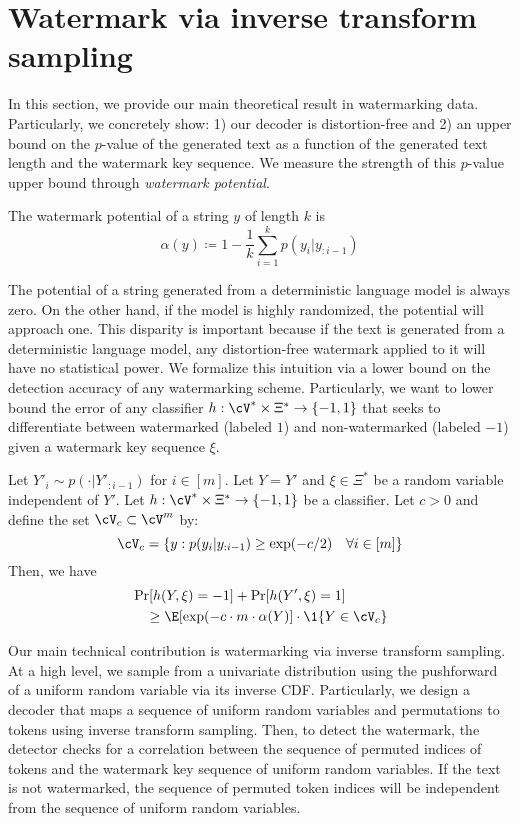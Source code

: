 \section{Watermark via inverse transform sampling}
\label{sec:inverse-transform}
%
In this section, we provide our main theoretical result in watermarking data. Particularly, we concretely show: 1) our decoder is distortion-free and 2) an upper bound on the $p$-value of the generated text as a function of the generated text length and the watermark key sequence. We measure the strength of this $p$-value upper bound through \emph{watermark potential}.
%
\begin{definition}
    The watermark potential of a string $y$ of length $k$ is %
    \begin{equation*}
        \alpha(y) \coloneqq 1 - \frac{1}{k} \sum_{i=1}^{k} p(y_i | y_{:i-1})
    \end{equation*}
    \label{def:potential}
\end{definition}
%
The potential of a string generated from a deterministic language model is always zero. On the other hand, if the model is highly randomized, the potential will approach one. This disparity is important because if the text is generated from a deterministic language model, any distortion-free watermark applied to it will have no statistical power. We formalize this intuition via a lower bound on the detection accuracy of any watermarking scheme. Particularly, we want to lower bound the error of any classifier $h: \cV^* \times \Xi^* \rightarrow \{-1,1\}$ that seeks to differentiate between watermarked (labeled $1$) and non-watermarked (labeled $-1$) given a watermark key sequence $\xi$. 
%
\begin{lemma}
Let $Y'_i \sim p(\cdot | Y'_{:i-1})$ for $i \in [m]$. Let $Y = Y'$ and $\xi \in \Xi^*$ be a random variable independent of $Y'$. Let $h: \cV^* \times \Xi^* \rightarrow \{-1,1\}$ be a classifier. Let $c > 0$ and define the set $\cV_c \subset \cV^m$ by:
%
\begin{equation*}
    \cV_{c} = \{ y: p(y_i | y_{:i-1}) \geq \exp(-c/2) \quad \forall i \in [m] \}
\end{equation*}
Then, we have
%
\begin{align*}
    &\Pr[h(Y, \xi) = -1] + \Pr[h(Y', \xi) = 1] \\
    &\quad \geq \E[\exp(-c \cdot m \cdot \alpha(Y)] \cdot \1\{Y \in \cV_c \}    
\end{align*}
%
\end{lemma}
%
Our main technical contribution is watermarking via inverse transform sampling. At a high level, we sample from a univariate distribution using the pushforward of a uniform random variable via its inverse CDF. Particularly, we design a decoder that maps a sequence of uniform random variables and permutations to tokens using inverse transform sampling. Then, to detect the watermark, the detector checks for a correlation between the sequence of permuted indices of tokens and the watermark key sequence of uniform random variables. If the text is not watermarked, the sequence of permuted token indices will be independent from the sequence of uniform random variables. 


